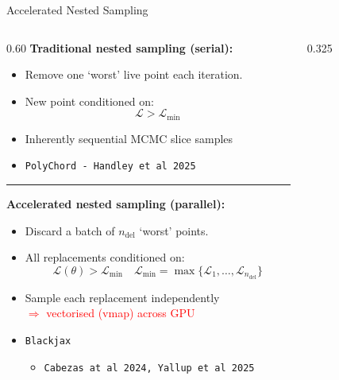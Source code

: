 \documentclass{beamer}
\begin{document}
\begin{frame}{Accelerated Nested Sampling}
\vspace{-0.5em}
\begin{columns}
    \begin{column}{0.60\textwidth}
    \scriptsize
    \textbf{Traditional nested sampling (serial):}
    \begin{itemize}
        \item Remove one `worst' live point each iteration.
        \item New point conditioned on:
        \vspace{-1em}
        \[
        \mathcal{L} > \mathcal{L}_{\min}
        \]
        \item Inherently sequential MCMC slice samples
        \item \texttt{PolyChord - Handley et al 2025}
    \end{itemize}
    \vspace{1em}
    \par\noindent\rule{\linewidth}{0.35pt}
    \vspace{1em}
    \textbf{Accelerated nested sampling (parallel):}
    \begin{itemize}
        \item Discard a batch of $n_{\text{del}}$ `worst' points.
        \item All replacements conditioned on:
        \vspace{-1em}
        \[
        \mathcal{L}(\theta) > \mathcal{L}_{\min}
        \quad
        \mathcal{L}_{\min} = \max\{\mathcal{L}_1, \ldots, \mathcal{L}_{n_{\text{del}}}\}
        \]
        \item Sample each replacement independently \\ 
              \textcolor{red}{$\Rightarrow$ vectorised (vmap) across GPU}
        \item \texttt{Blackjax}
        \begin{itemize}
        \scriptsize
            \item \texttt{Cabezas at al 2024, Yallup et al 2025}
        \end{itemize} 
    \end{itemize}
 
    \end{column}

    \begin{column}{0.325\textwidth}
        \vspace{0.6em}
        \begin{figure}
            \centering


\end{figure}
\end{column}
\end{columns}
\end{frame}
\end{document}
